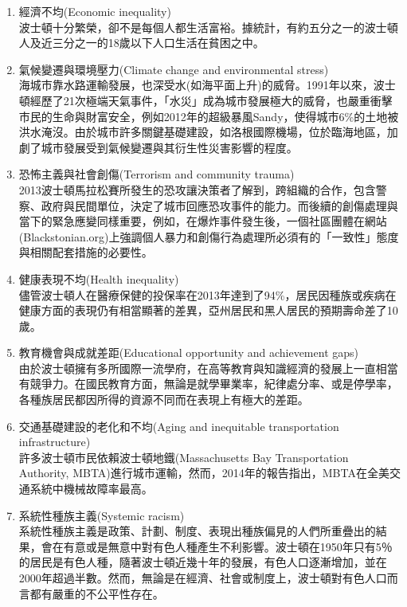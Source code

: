 \documentclass[a4paper,12pt]{article}
\begin{document}
\begin{enumerate}
\begin{enumerate}
\begin{enumerate}
\item 經濟不均(Economic inequality)\\
波士頓十分繁榮，卻不是每個人都生活富裕。據統計，有約五分之一的波士頓人及近三分之一的18歲以下人口生活在貧困之中。\\
\item 氣候變遷與環境壓力(Climate change and environmental stress)\\
海城市靠水路運輸發展，也深受水(如海平面上升)的威脅。1991年以來，波士頓經歷了21次極端天氣事件，「水災」成為城市發展極大的威脅，也嚴重衝擊市民的生命與財富安全，例如2012年的超級暴風Sandy，使得城市6\%的土地被洪水淹沒。由於城市許多關鍵基礎建設，如洛根國際機場，位於臨海地區，加劇了城市發展受到氣候變遷與其衍生性災害影響的程度。\\
\item 恐怖主義與社會創傷(Terrorism and community trauma)\\
2013波士頓馬拉松賽所發生的恐攻讓決策者了解到，跨組織的合作，包含警察、政府與民間單位，決定了城市回應恐攻事件的能力。而後續的創傷處理與當下的緊急應變同樣重要，例如，在爆炸事件發生後，一個社區團體在網站(Blackstonian.org)上強調個人暴力和創傷行為處理所必須有的「一致性」態度與相關配套措施的必要性。\\
\item 健康表現不均(Health inequality)\\
儘管波士頓人在醫療保健的投保率在2013年達到了94\%，居民因種族或疾病在健康方面的表現仍有相當顯著的差異，亞州居民和黑人居民的預期壽命差了10歲。\\
\item 教育機會與成就差距(Educational opportunity and achievement gaps)\\
由於波士頓擁有多所國際一流學府，在高等教育與知識經濟的發展上一直相當有競爭力。在國民教育方面，無論是就學畢業率，紀律處分率、或是停學率，各種族居民都因所得的資源不同而在表現上有極大的差距。\\
\item 交通基礎建設的老化和不均(Aging and inequitable transportation infrastructure)\\
許多波士頓市民依賴波士頓地鐵(Massachusetts Bay Transportation Authority, MBTA)進行城市運輸，然而，2014年的報告指出，MBTA在全美交通系統中機械故障率最高。\\
\item 系統性種族主義(Systemic racism)\\
系統性種族主義是政策、計劃、制度、表現出種族偏見的人們所重疊出的結果，會在有意或是無意中對有色人種產生不利影響。波士頓在1950年只有5％的居民是有色人種，隨著波士頓近幾十年的發展，有色人口逐漸增加，並在2000年超過半數。然而，無論是在經濟、社會或制度上，波士頓對有色人口而言都有嚴重的不公平性存在。\\
\end{enumerate}


\end{enumerate}
\end{enumerate}
\end{document}
